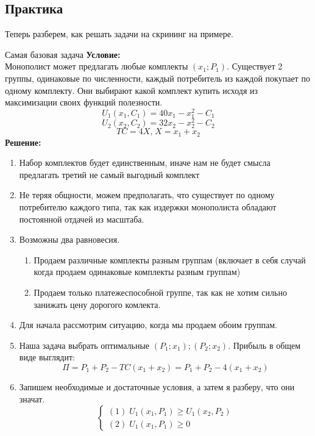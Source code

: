 \subsection{Практика}

Теперь разберем, как решать задачи на скрининг на примере.

\begin{mybox}{Самая базовая задача}
    \textbf{Условие:}\\ Монополист может предлагать любые комплекты $(x_1;P_1)$. Существует 2 группы, одинаковые по
    численности, каждый потребитель из каждой покупает по одному комплекту. Они выбирают какой комплект купить исходя из
    максимизации своих функций полезности. \\
    $$U_1(x_1,C_1)=40x_1-x_1^2-C_1$$
    $$U_2(x_2,C_2)=32x_2-x_2^2-C_2$$
    $$TC=4X\text{,}\;X=x_1+x_2$$
    \tcblower
    \textbf{Решение:}
    \begin{enumerate}
        \item Набор комплектов будет единственным, иначе нам не будет смысла предлагать третий не самый выгодный
        комплект
        \item Не теряя общности, можем предполагать, что существует по одному потребителю каждого типа, так как издержки
        монополиста обладают постоянной отдачей из масштаба.
        \item Возможны два равновесия. \begin{enumerate}
            \item Продаем различные комплекты разным группам (включает в себя случай когда продаем одинаковые комплекты
            разным группам)
            \item Продаем только платежеспособной группе, так как не хотим сильно занижать цену дорогого комлекта.
        \end{enumerate}
        \item Для начала рассмотрим ситуацию, когда мы продаем обоим группам.
        \item Наша задача выбрать оптимальные $(P_1;x_1);(P_2;x_2)$. Прибыль в общем виде выглядит:
        $$\Pi=P_1+P_2-TC(x_1+x_2)=P_1+P_2-4(x_1+x_2)$$
        \item Запишем необходимые и достаточные условия, а затем я разберу, что они значат.
        \begin{equation*}
         \begin{cases}
           (1)\;U_1(x_1,P_1)\geq U_1(x_2,P_2)
           \\
           (2)\;U_1(x_1,P_1)\geq 0

\end{cases}
\end{equation*}
\end{enumerate}
\end{mybox}
